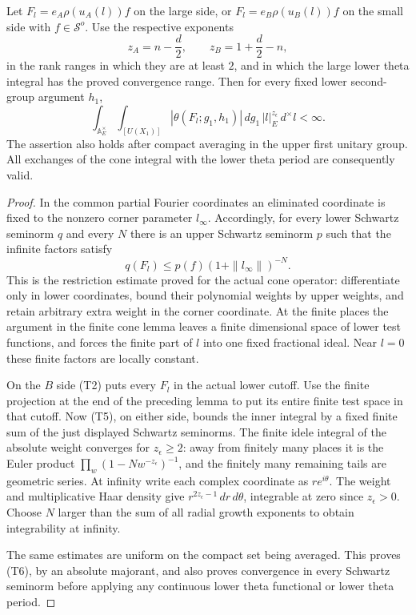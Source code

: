 \begin{srlemma}
\label{lem:sr-theta-cone-joint-integrability}
Let \(F_l=e_A\rho(u_A(l))f\) on the large side, or
\(F_l=e_B\rho(u_B(l))f\) on the small side with \(f\in\mathcal S^o\).
Use the respective exponents
\[
 z_A=n-\frac d2,\qquad z_B=1+\frac d2-n,
\]
in the rank ranges in which they are at least \(2\), and in which
the large lower theta integral has the proved convergence range.
Then for every fixed lower second-group argument \(h_1\),
\[
 \int_{\mathbb A_E^\times}\int_{[U(X_1)]}
       |\theta(F_l;g_1,h_1)|\,dg_1\,|l|_E^{z_\epsilon}
                       \,d^\times l <\infty .
 \tag{T6}\label{eq:sr-theta-cone-joint-integrability}
\]
The assertion also holds after compact averaging in the upper first
unitary group. All exchanges of the cone integral with the lower
theta period are consequently valid.
\end{srlemma}

\begin{proof}
In the common partial Fourier coordinates an eliminated coordinate is
fixed to the nonzero corner parameter \(l_\infty\). Accordingly, for
every lower Schwartz seminorm \(q\) and every \(N\) there is an upper
Schwartz seminorm \(p\) such that the infinite factors satisfy
\[
 q(F_l)\le p(f)(1+\|l_\infty\|)^{-N}.
\]
This is the restriction estimate proved for the actual cone operator:
differentiate only in lower coordinates, bound their polynomial
weights by upper weights, and retain arbitrary extra weight in the
corner coordinate. At the finite places the argument in the finite
cone lemma leaves a finite dimensional space of lower test functions,
and forces the finite part of \(l\) into one fixed fractional ideal.
Near \(l=0\) these finite factors are locally constant.

On the \(B\) side (T2) puts every \(F_l\) in the actual lower cutoff.
Use the finite projection at the end of the preceding lemma to put
its entire finite test space in that cutoff. Now (T5), on either side,
bounds the inner integral by a fixed finite sum of the just displayed
Schwartz seminorms. The finite idele integral of the absolute
weight converges for \(z_\epsilon\ge2\): away from finitely many
places it is the Euler product
\(\prod_w(1-Nw^{-z_\epsilon})^{-1}\), and the finitely many remaining
tails are geometric series. At infinity write each complex coordinate
as \(r e^{i\theta}\). The weight and multiplicative Haar density give
\(r^{2z_\epsilon-1}\,dr\,d\theta\), integrable at zero since
\(z_\epsilon>0\). Choose \(N\) larger than the sum of all radial growth
exponents to obtain integrability at infinity.

The same estimates are uniform on the compact set being averaged.
This proves (T6), by an absolute majorant, and also proves convergence
in every Schwartz seminorm before applying any continuous lower theta
functional or lower theta period.
\end{proof}

